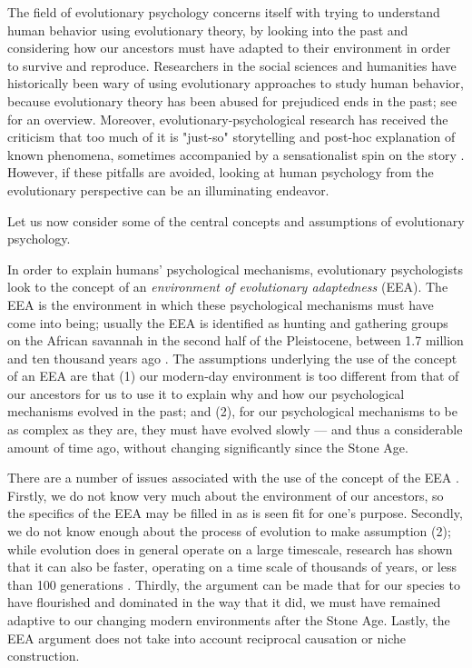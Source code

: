 The field of evolutionary psychology concerns itself with trying to understand human behavior using evolutionary theory, by looking into the past and considering how our ancestors must have adapted to their environment in order to survive and reproduce.
Researchers in the social sciences and humanities have historically been wary of using evolutionary approaches to study human behavior, because evolutionary theory has been abused for prejudiced ends in the past; see \citet[pp.~19--20]{LB02} for an overview. Moreover, evolutionary-psychological research has received the criticism that too much of it is "just-so" storytelling and post-hoc explanation of known phenomena, sometimes accompanied by a sensationalist spin on the story \citep{LB02}.
However, if these pitfalls are avoided, looking at human psychology from the evolutionary perspective can be an illuminating endeavor.

Let us now consider some of the central concepts and assumptions of evolutionary psychology.

In order to explain humans' psychological mechanisms, evolutionary psychologists look to the concept of an \emph{environment of evolutionary adaptedness} (EEA). The EEA is the environment in which these psychological mechanisms must have come into being; usually the EEA is identified as hunting and gathering groups on the African savannah in the second half of the Pleistocene, between 1.7 million and ten thousand years ago \citep{LB02} .
The assumptions underlying the use of the concept of an EEA are that (1) our modern-day environment is too different from that of our ancestors for us to use it to explain why and how our psychological mechanisms evolved in the past; and (2), for our psychological mechanisms to be as complex as they are, they must have evolved slowly --- and thus a considerable amount of time ago, without changing significantly since the Stone Age.

There are a number of issues associated with the use of the concept of the EEA \citep{LB02}. Firstly, we do not know very much about the environment of our ancestors, so the specifics of the EEA may be filled in as is seen fit for one's purpose. Secondly, we do not know enough about the process of evolution to make assumption (2); while evolution does in general operate on a large timescale, research has shown that it can also be faster, operating on a time scale of thousands of years, or less than 100 generations \citep[pp.~190--191 and references therein]{LB02}. Thirdly, the argument can be made that for our species to have flourished and dominated in the way that it did, we must have remained adaptive to our changing modern environments after the Stone Age. Lastly, the EEA argument does not take into account reciprocal causation or niche construction.

